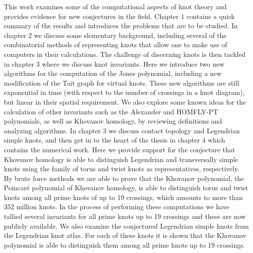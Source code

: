 This work examines some of the computational aspects of knot theory and
provides evidence for new conjectures in the field. Chapter 1 contains a quick
summary of the results and introduces the problems that are to be studied.
In chapter 2 we discuss some elementary background, including several of the
combinatorial methods of representing knots that allow one to make use of
computers in their calculations. The challenge of discerning knots is then
tackled in chapter 3 where we discuss knot invariants. Here we introduce two
new algorithms for the computation of the Jones polynomial,
including a new modification of the Tait graph for virtual knots.
These new algorithms are still exponential in time (with respect to the number
of crossings in a knot diagram), but linear in their spatial requirement.
We also explore some known ideas for the calculation
of other invariants such as the Alexander and HOMFLY-PT polynomials, as well as
Khovanov homology, by reviewing definitions and analyzing algorithms.
In chapter 3 we discuss contact topology and Legendrian
simple knots, and then get in to the heart of
the thesis in chapter 4 which contains the numerical work. Here we provide
support for the conjecture that Khovanov homology is able to distinguish
Legendrian and transversally simple knots using the family of torus and twist knots as
representatives, respectively. By brute force methods we are able to prove that
the Khovanov polynomial, the Poincar\'{e} polynomial of Khovanov homology, is
able to distinguish torus and twist knots among all prime knots of up to 19
crossings, which amounts to more than 352 million knots. In the process of
performing these computations we have tallied several invariants for all
prime knots up to 19 crossings and these are now publicly available. We also
examine the conjectured Legendrian simple knots from the Legendrian knot atlas.
For each of these knots it is shown that the Khovanov polynomial is able to
distinguish them among all prime knots up to 19 crossings.
